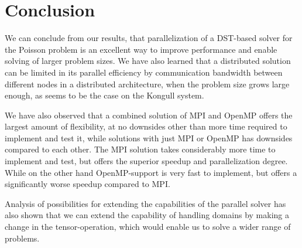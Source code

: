\documentclass[fontsize=11pt,paper=a4,titlepage]{article}
\begin{document}
\section{Conclusion}

We can conclude from our results, that parallelization of a DST-based solver for
the Poisson problem is an excellent way to improve performance and enable
solving of larger problem sizes. We have also learned that a distributed
solution can be limited in its parallel efficiency by communication bandwidth
between different nodes in a distributed architecture, when the problem size
grows large enough, as seems to be the case on the Kongull system.

We have also observed that a combined solution of MPI and OpenMP offers the
largest amount of flexibility, at no downsides other than more time required to
implement and test it, while solutions with just MPI or OpenMP has downsides
compared to each other. The MPI solution takes considerably more time to
implement and test, but offers the superior speedup and parallelization degree.
While on the other hand OpenMP-support is very fast to implement, but offers a
significantly worse speedup compared to MPI.

Analysis of possibilities for extending the capabilities of the parallel solver has also shown
 that we can extend the capability of handling domains by making a change in the tensor-operation,
  which would enable us to solve a wider range of problems.



{}

\end{document}
